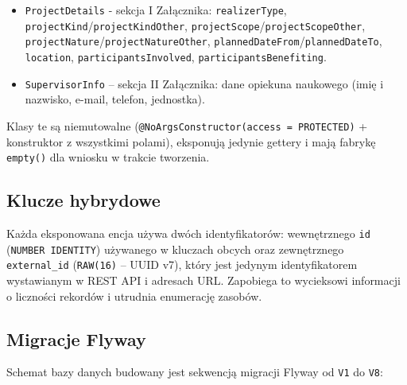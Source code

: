 \documentclass[12pt,a4paper]{article}
\begin{document}
\begin{itemize}[leftmargin=*]
  \item \texttt{ProjectDetails} - sekcja I Załącznika: \texttt{realizerType},
        \texttt{projectKind}\slash\texttt{projectKindOther},
        \texttt{projectScope}\slash\texttt{projectScopeOther},
        \texttt{projectNature}\slash\texttt{projectNatureOther},
        \texttt{plannedDateFrom}\slash\texttt{plannedDateTo}, \texttt{location},
        \texttt{participantsInvolved}, \texttt{participantsBenefiting}.
  \item \texttt{SupervisorInfo} -- sekcja II Załącznika: dane opiekuna
        naukowego (imię i nazwisko, e-mail, telefon, jednostka).
\end{itemize}

Klasy te są niemutowalne (\texttt{@NoArgsConstructor(access = PROTECTED)} +
konstruktor z wszystkimi polami), eksponują jedynie gettery i mają fabrykę
\texttt{empty()} dla wniosku w trakcie tworzenia.

\subsection{Klucze hybrydowe}
Każda eksponowana encja używa dwóch identyfikatorów:
wewnętrznego \texttt{id} (\texttt{NUMBER IDENTITY}) używanego w kluczach obcych
oraz zewnętrznego \texttt{external\_id} (\texttt{RAW(16)} -- UUID v7),
który jest jedynym identyfikatorem wystawianym w REST API i adresach URL.
Zapobiega to wycieksowi informacji o liczności rekordów i utrudnia enumerację zasobów.

\subsection{Migracje Flyway}
Schemat bazy danych budowany jest sekwencją migracji Flyway od \texttt{V1}
do \texttt{V8}:
\end{document}
